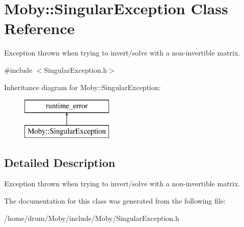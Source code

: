 \section{Moby\-:\-:Singular\-Exception Class Reference}
\label{classMoby_1_1SingularException}


Exception thrown when trying to invert/solve with a non-\/invertible matrix.  




{\ttfamily \#include $<$Singular\-Exception.\-h$>$}

Inheritance diagram for Moby\-:\-:Singular\-Exception\-:\begin{figure}[H]
\begin{center}
\leavevmode
\includegraphics[height=2.000000cm]{classMoby_1_1SingularException}
\end{center}
\end{figure}


\subsection{Detailed Description}
Exception thrown when trying to invert/solve with a non-\/invertible matrix. 

The documentation for this class was generated from the following file\-:\begin{DoxyCompactItemize}
\item 
/home/drum/\-Moby/include/\-Moby/Singular\-Exception.\-h\end{DoxyCompactItemize}
